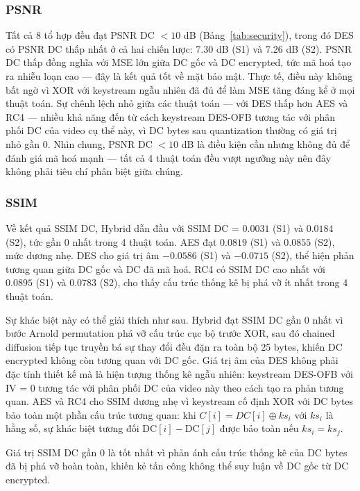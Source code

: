 \subsubsection{PSNR}

Tất cả 8 tổ hợp đều đạt PSNR DC $< 10$ dB (Bảng~\ref{tab:security}), trong đó DES có PSNR DC thấp nhất ở cả hai chiến lược: 7.30 dB (S1) và 7.26 dB (S2). PSNR DC thấp đồng nghĩa với MSE lớn giữa DC gốc và DC encrypted, tức mã hoá tạo ra nhiễu loạn cao --- đây là kết quả tốt về mặt bảo mật. Thực tế, điều này không bất ngờ vì XOR với keystream ngẫu nhiên đã đủ để làm MSE tăng đáng kể ở mọi thuật toán. Sự chênh lệch nhỏ giữa các thuật toán --- với DES thấp hơn AES và RC4 --- nhiều khả năng đến từ cách keystream DES-OFB tương tác với phân phối DC của video cụ thể này, vì DC bytes sau quantization thường có giá trị nhỏ gần 0. Nhìn chung, PSNR DC $< 10$ dB là điều kiện cần nhưng không đủ để đánh giá mã hoá mạnh --- tất cả 4 thuật toán đều vượt ngưỡng này nên đây không phải tiêu chí phân biệt giữa chúng.

\subsubsection{SSIM}

Về kết quả SSIM DC, Hybrid dẫn đầu với SSIM DC = $0.0031$ (S1) và $0.0184$ (S2), tức gần 0 nhất trong 4 thuật toán. AES đạt $0.0819$ (S1) và $0.0855$ (S2), mức dương nhẹ. DES cho giá trị âm $-0.0586$ (S1) và $-0.0715$ (S2), thể hiện phản tương quan giữa DC gốc và DC đã mã hoá. RC4 có SSIM DC cao nhất với $0.0895$ (S1) và $0.0783$ (S2), cho thấy cấu trúc thống kê bị phá vỡ ít nhất trong 4 thuật toán.

Sự khác biệt này có thể giải thích như sau. Hybrid đạt SSIM DC gần 0 nhất vì bước Arnold permutation phá vỡ cấu trúc cục bộ trước XOR, sau đó chained diffusion tiếp tục truyền bá sự thay đổi đều đặn ra toàn bộ 25 bytes, khiến DC encrypted không còn tương quan với DC gốc. Giá trị âm của DES không phải đặc tính thiết kế mà là hiện tượng thống kê ngẫu nhiên: keystream DES-OFB với IV = 0 tương tác với phân phối DC của video này theo cách tạo ra phản tương quan. AES và RC4 cho SSIM dương nhẹ vì keystream cố định XOR với DC bytes bảo toàn một phần cấu trúc tương quan: khi $C[i] = DC[i] \oplus ks_i$ với $ks_i$ là hằng số, sự khác biệt tương đối $\text{DC}[i] - \text{DC}[j]$ được bảo toàn nếu $ks_i = ks_j$.

Giá trị SSIM DC gần 0 là tốt nhất vì phản ánh cấu trúc thống kê của DC bytes đã bị phá vỡ hoàn toàn, khiến kẻ tấn công không thể suy luận về DC gốc từ DC encrypted.

